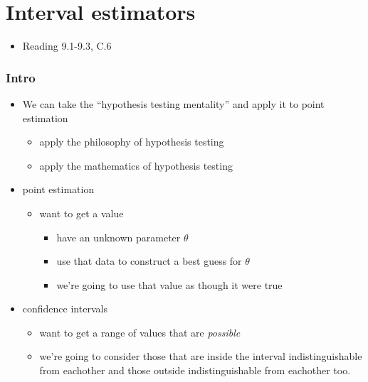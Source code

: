 
\part*{Interval estimators}%

\begin{itemize}
\item Reading \citet{CaB_2001} 9.1-9.3, \citet{Gre_2011} C.6
\end{itemize}

\section{Intro}

\begin{itemize}
\item We can take the ``hypothesis testing mentality'' and apply it to
      point estimation
\begin{itemize}
\item apply the philosophy of hypothesis testing
\item apply the mathematics of hypothesis testing
\end{itemize}
\item point estimation
\begin{itemize}
\item want to get a value
\begin{itemize}
\item have an unknown parameter $\theta$
\item use that data to construct a best guess for $\theta$
\item we're going to use that value as though it were true
\end{itemize}
\end{itemize}
\item confidence intervals
\begin{itemize}
\item want to get a range of values that are \emph{possible}
\item we're going to consider those that are inside the interval
        indistinguishable from eachother and those outside
        indistinguishable from eachother too.
\end{itemize}
\end{itemize}

